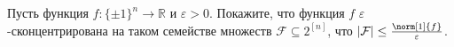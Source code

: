 Пусть функция $f\colon \{\pm 1\}^n \to \mathbb{R}$ и $\varepsilon > 0$. Покажите, что функция $f$
$\varepsilon$-сконцентрирована на таком семействе множеств $\mathcal{F} \subseteq 2^{[n]}$, что
$|\mathcal{F}| \le \frac{\norm[1]{f}}{\varepsilon}$. 
